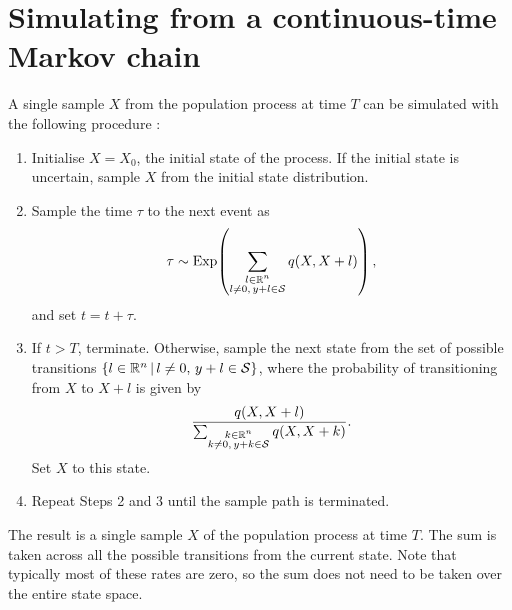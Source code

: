 \section{Simulating from a continuous-time Markov chain}\label{app:ctmc_sim}
A single sample \(X\) from the population process at time \(T\) can be simulated with the following procedure \citep{Gillespie_1977_ExactStochasticSimulation}:
\begin{enumerate}
	\item Initialise \(X = X_0\), the initial state of the process.
	      If the initial state is uncertain, sample \(X\) from the initial state distribution.

	\item Sample the time \(\tau\) to the next event as
	      \[
		      \tau \sim\mathrm{Exp}\!\left(\sum_{\substack{l \in \mathbb{R}^n \\ l \neq 0,\, y + l \in \mathcal{S}}}{q\!\left(X, X + l\right)}\right),
	      \]
	      and set \(t = t + \tau\).

	\item If \(t > T\), terminate.
	      Otherwise, sample the next state from the set of possible transitions \(\left\{l \in \mathbb{R}^n\,\middle|\,l \neq 0,\, y + l \in \mathcal{S}\right\}\), where the probability of transitioning from \(X\) to \(X + l\) is given by
	      \[
		      \frac{q\!\left(X, X + l\right)}{\sum_{\substack{k \in \mathbb{R}^n \\ k \neq 0,\, y + k \in \mathcal{S}}}{q\!\left(X, X + k\right)}}.
	      \]
	      Set \(X\) to this state.

	\item Repeat Steps 2 and 3 until the sample path is terminated.

\end{enumerate}
The result is a single sample \(X\) of the population process at time \(T\).
The sum is taken across all the possible transitions from the current state.
Note that typically most of these rates are zero, so the sum does not need to be taken over the entire state space.


